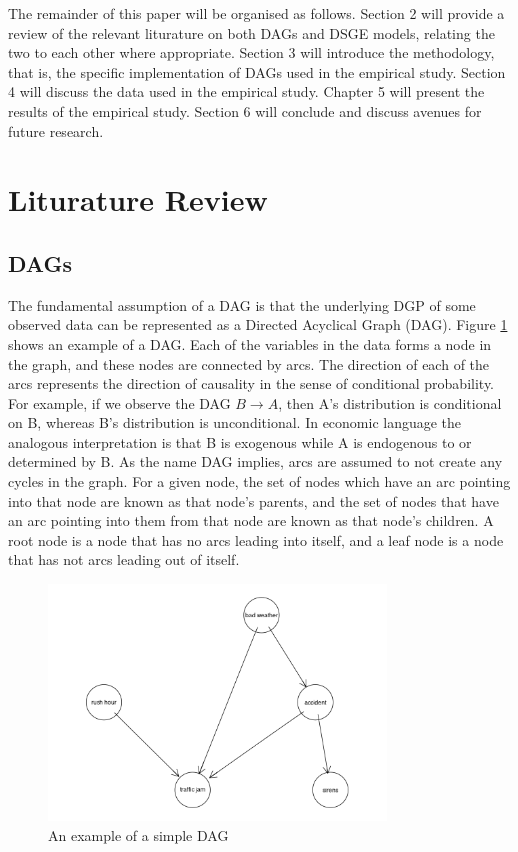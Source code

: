 \documentclass{article}
\begin{document}
The remainder of this paper will be organised as follows. Section 2 will provide a review of the relevant liturature on both DAGs and DSGE models, relating the two to each other where appropriate. Section 3 will introduce the methodology, that is, the specific implementation of DAGs used in the empirical study. Section 4 will discuss the data used in the empirical study. Chapter 5 will present the results of the empirical study. Section 6 will conclude and discuss avenues for future research.

\section{Liturature Review}

\subsection{DAGs}

The fundamental assumption of a DAG is that the underlying DGP of some observed data can be represented as a Directed Acyclical Graph (DAG). Figure \ref{dag1} shows an example of a DAG. Each of the variables in the data forms a node in the graph, and these nodes are connected by arcs. The direction of each of the arcs represents the direction of causality in the sense of conditional probability. For example, if we observe the DAG $B \rightarrow A$, then A's distribution is conditional on B, whereas B's distribution is unconditional. In economic language the analogous interpretation is that B is exogenous while A is endogenous to or determined by B. As the name DAG implies, arcs are assumed to not create any cycles in the graph. For a given node, the set of nodes which have an arc pointing into that node are known as that node's parents, and the set of nodes that have an arc pointing into them from that node are known as that node's children. A root node is a node that has no arcs leading into itself, and a leaf node is a node that has not arcs leading out of itself.

\begin{figure}
  \centering
  \includegraphics[width=0.8\textwidth]{images/trafficjam.png}
  \caption{An example of a simple DAG \parencite{traffic_jam}}
  \label{dag1}
\end{figure}
\end{document}
